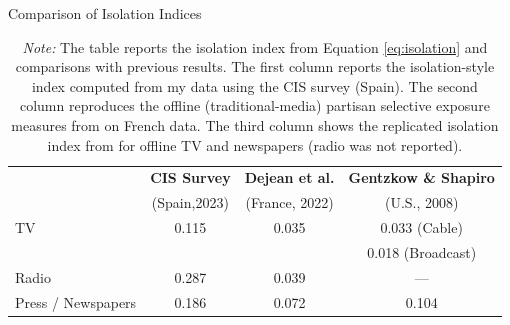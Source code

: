 \documentclass[12pt]{article}
\begin{document}
	
	\begin{table}[H]
		\caption{Comparison of Isolation Indices}
		\label{tab:isolation_table_compare}
		\centering
		\begin{tabular}{lccc}
			\hline
 & \textbf{CIS Survey} & \textbf{Dejean et al.} & \textbf{Gentzkow \& Shapiro} \\
			&  (Spain,2023) & (France, 2022) &  (U.S., 2008) \\
			\hline
			TV & 0.115 & 0.035 & 0.033 \scriptsize{(Cable)}\\
						 &  &  & \hspace{0.45cm} 0.018 \scriptsize{(Broadcast)} \\
			Radio & 0.287 & 0.039 & — \\
			Press / Newspapers & 0.186 & 0.072 & 0.104\\
			\hline
		\end{tabular}
			\caption*{\small  \textit{Note:} The table reports the isolation index from Equation \ref{eq:isolation} and comparisons with previous results. 
				The first column reports the isolation-style index computed from my data using the CIS survey (Spain).
				The second column reproduces the offline (traditional-media) partisan selective exposure measures from \cite{Dejean2022PartisanSE} on French data. 
				The third column shows the replicated isolation index from \cite{gentzkow_isolation} for offline TV and newspapers (radio was not reported).}
		
	\end{table}
	
\end{document}

